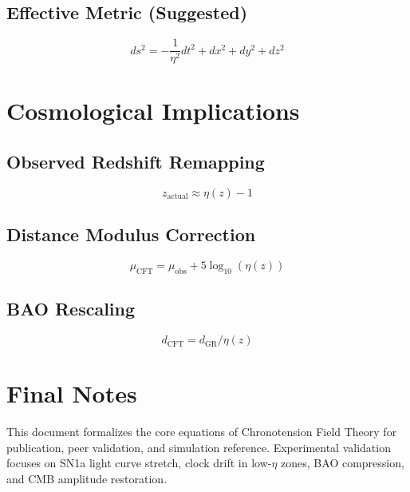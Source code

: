 \documentclass{article}
\begin{document}
\subsection{Effective Metric (Suggested)}
\begin{equation}
ds^2 = -\frac{1}{\eta^2} dt^2 + dx^2 + dy^2 + dz^2
\end{equation}

\section{Cosmological Implications}

\subsection{Observed Redshift Remapping}
\begin{equation}
z_{\text{actual}} \approx \eta(z) - 1
\end{equation}

\subsection{Distance Modulus Correction}
\begin{equation}
\mu_{\text{CFT}} = \mu_{\text{obs}} + 5 \log_{10} (\eta(z))
\end{equation}

\subsection{BAO Rescaling}
\begin{equation}
d_{\text{CFT}} = d_{\text{GR}} / \eta(z)
\end{equation}

\section{Final Notes}
This document formalizes the core equations of Chronotension Field Theory for publication, peer validation, and simulation reference. Experimental validation focuses on SN1a light curve stretch, clock drift in low-\(\eta\) zones, BAO compression, and CMB amplitude restoration.
\end{document}
